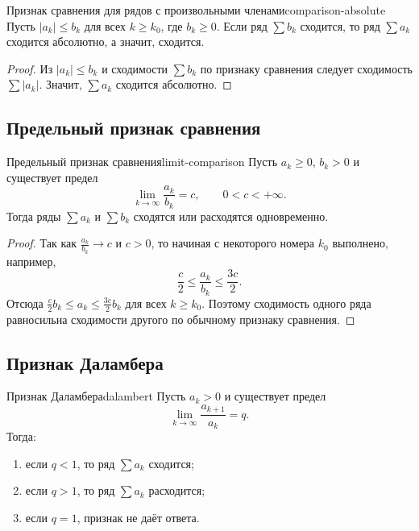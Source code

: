 \begin{Corollary}{Признак сравнения для рядов с произвольными членами}{comparison-absolute}
	Пусть $|a_k| \le b_k$ для всех $k \ge k_0$, где $b_k \ge 0$. Если ряд $\sum b_k$ сходится, то ряд $\sum a_k$ сходится абсолютно, а значит, сходится.
\end{Corollary}

\begin{proof}
	Из $|a_k| \le b_k$ и сходимости $\sum b_k$ по признаку сравнения следует сходимость $\sum |a_k|$. Значит, $\sum a_k$ сходится абсолютно.
\end{proof}

\subsection{Предельный признак сравнения}

\begin{Theorem}{Предельный признак сравнения}{limit-comparison}
	Пусть $a_k \ge 0$, $b_k > 0$ и существует предел
	\[
	\lim_{k\to\infty} \frac{a_k}{b_k} = c,
	\qquad
	0 < c < +\infty.
	\]
	Тогда ряды $\sum a_k$ и $\sum b_k$ сходятся или расходятся одновременно.
\end{Theorem}

\begin{proof}
	Так как $\frac{a_k}{b_k} \to c$ и $c>0$, то начиная с некоторого номера $k_0$ выполнено, например,
	\[
	\frac c2 \le \frac{a_k}{b_k} \le \frac{3c}{2}.
	\]
	Отсюда $\frac c2 b_k \le a_k \le \frac{3c}{2}b_k$ для всех $k\ge k_0$. Поэтому сходимость одного ряда равносильна сходимости другого по обычному признаку сравнения.
\end{proof}

\subsection{Признак Даламбера}

\begin{Theorem}{Признак Даламбера}{dalambert}
	Пусть $a_k > 0$ и существует предел
	\[
	\lim_{k\to\infty} \frac{a_{k+1}}{a_k} = q.
	\]
	Тогда:
	
	\begin{enumerate}
		\item если $q<1$, то ряд $\sum a_k$ сходится;
		\item если $q>1$, то ряд $\sum a_k$ расходится;
		\item если $q=1$, признак не даёт ответа.
	\end{enumerate}
\end{Theorem}

